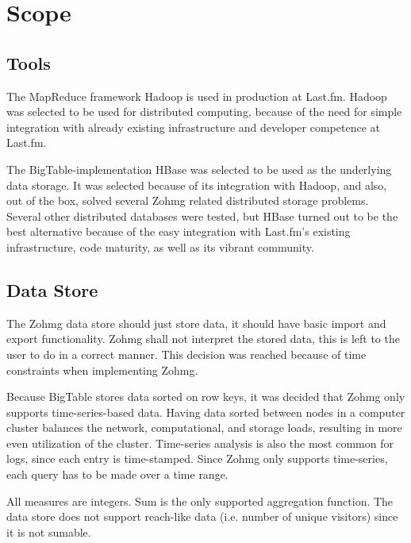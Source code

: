 \section{Scope}

\subsection*{Tools}

The MapReduce framework Hadoop is used in production at Last.fm. Hadoop was
selected to be used for distributed computing, because of the need for simple
integration with already existing infrastructure and developer competence at
Last.fm.

The BigTable-implementation HBase was selected to be used as the underlying data
storage. It was selected because of its integration with Hadoop, and also, out of
the box, solved several Zohmg related distributed storage problems. Several
other distributed databases were tested, but HBase turned out to be the best
alternative because of the easy integration with Last.fm's existing
infrastructure, code maturity, as well as its vibrant community.


\subsection*{Data Store}

The Zohmg data store should just store data, it should have basic import
and export functionality. Zohmg shall not interpret the stored data, this is
left to the user to do in a correct manner. This decision was reached because of
time constraints when implementing Zohmg.

Because BigTable stores data sorted on row keys, it was decided that Zohmg only
supports time-series-based data. Having data sorted between nodes in a computer
cluster balances the network, computational, and storage loads, resulting in
more even utilization of the cluster. Time-series analysis is also the most
common for logs, since each entry is time-stamped. \cite{discoveringweb} Since
Zohmg only supports time-series, each query has to be made over a time range.

All measures are integers. Sum is the only supported aggregation function. The
data store does not support reach-like data (i.e. number of unique visitors)
since it is not sumable.


